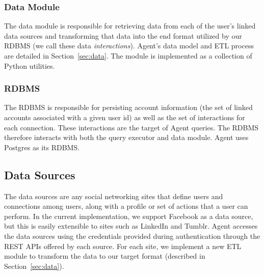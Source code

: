 \subsubsection{Data Module}
The data module is responsible for retrieving data from each of the user's
linked data sources and transforming that data into the end format utilized by
our RDBMS (we call these data {\it interactions}). Agent's data model and ETL
process are detailed in Section~\ref{sec:data}. The module is implemented as a
collection of Python utilities.

\subsubsection{RDBMS}
The RDBMS is responsible for persisting account information (the set of linked
accounts associated with a given user id) as well as the set of interactions for
each connection. These interactions are the target of Agent queries. The RDBMS
therefore interacts with both the query executor and data module. Agent uses
Postgres as its RDBMS.

\subsection{Data Sources}
The data sources are any social networking sites that define users and
connections among users, along with a profile or set of actions that a user can
perform. In the current implementation, we support Facebook as a data source,
but this is easily extensible to sites such as LinkedIn and Tumblr. Agent
accesses the data sources using the credentials provided during authentication
through the REST APIs offered by each source. For each site, we implement a new
ETL module to transform the data to our target format (described in
Section~\ref{sec:data}).
